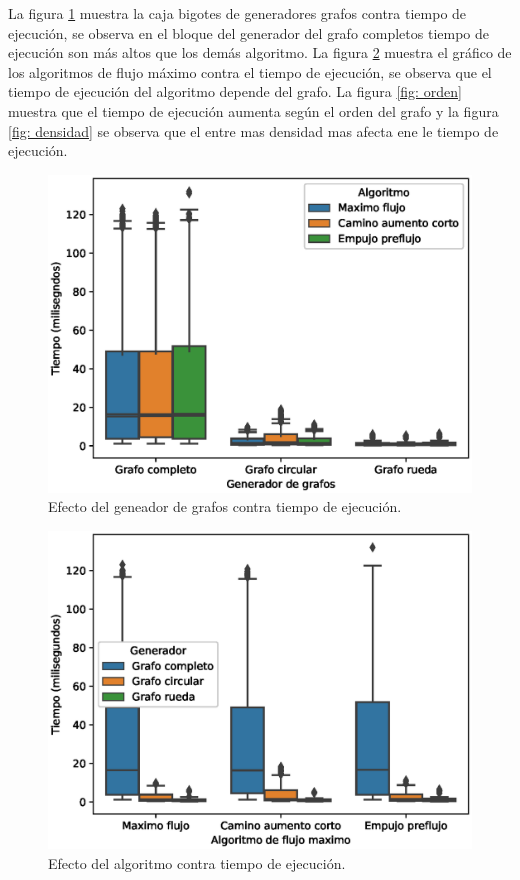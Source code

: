 \documentclass[12pt, a4paper]{article}
\begin{document}
La figura \ref{fig: generador} muestra la caja bigotes de generadores grafos contra tiempo de ejecuci\'on, se observa en el bloque del generador del grafo completos tiempo de ejecuci\'on son m\'as altos que los dem\'as algoritmo. La figura \ref{fig: algoritmo} muestra el gr\'afico de los algoritmos de flujo m\'aximo contra el tiempo de ejecuci\'on, se observa que el tiempo de ejecuci\'on del algoritmo depende del grafo. La figura \ref{fig: orden} muestra que el tiempo de ejecuci\'on aumenta seg\'un el orden del grafo y la figura \ref{fig: densidad} se observa que el entre mas densidad mas afecta ene le tiempo de ejecuci\'on.
\begin{figure} [H] \centering
\includegraphics[scale=0.8]{figura1}
\caption{Efecto del geneador de grafos contra tiempo de ejecuci\'on.}
\label{fig: generador}
\end{figure}

\begin{figure} [H] \centering
\includegraphics[scale=0.8]{figura2}
\caption{Efecto del algoritmo contra tiempo de ejecuci\'on.}
\label{fig: algoritmo}
\end{figure}
\end{document}
